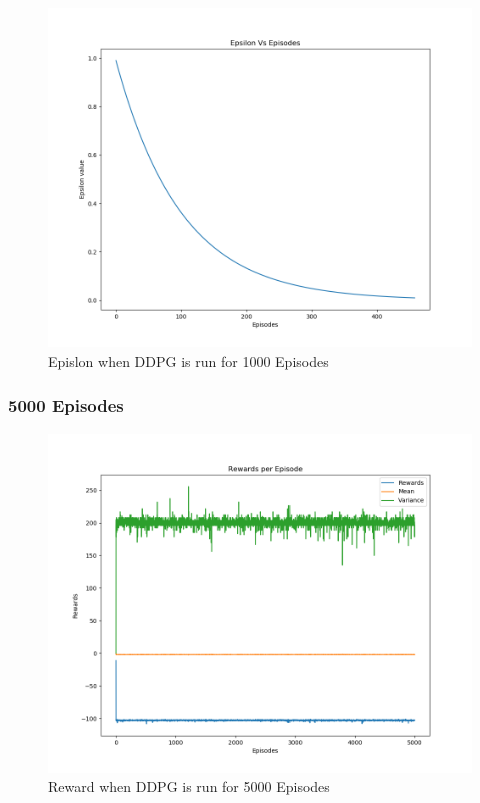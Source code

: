 \documentclass[doc, onecolumn, 12pt]{apa6}
\begin{document}
\begin{figure}

\includegraphics[width =\textwidth, height=0.4 \textheight]{results/ddpg/1000_ep/Epsilon.png}
\caption{Epislon when DDPG is run for 1000 Episodes}
\label{DDPG_1000Ep_Epsilon}
\end{figure}

\FloatBarrier 

\subsubsection{5000 Episodes}


\begin{figure}
\label{DDPG_5000Ep_Rewards}
\includegraphics[width =\textwidth, height=0.4 \textheight]{results/ddpg/5000_ep/Rewards.png}
\caption{Reward when DDPG is run for 5000 Episodes}
\end{figure}
\end{document}
